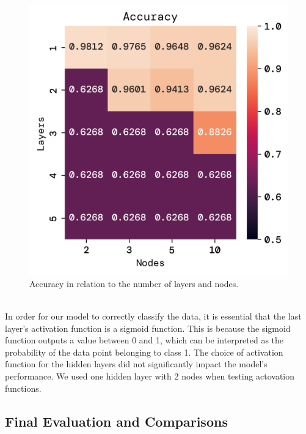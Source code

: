\documentclass[twoside,11pt]{report}
\begin{document}
\begin{figure}[!ht]
\begin{minipage}[t]{0.5\textwidth - 1mm}
\begin{center}
                \includegraphics[width=\textwidth]{../runsAndFigures/accuracy_layers_nodes.png}
            \end{center}
            \caption
            {
                Accuracy in relation to the number of layers and nodes.
            }\label{fig:accuracy_layers_nodes}
        \end{minipage}
    \end{figure}


    \noindent
    \\
    In order for our model to correctly classify the data, it is essential that the last layer's activation function
    is a sigmoid function. This is because the sigmoid function outputs a value between 0 and 1, which can be
    interpreted as the probability of the data point belonging to class 1. The choice of activation function for the
    hidden layers did not significantly impact the model's performance.
    We used one hidden layer with 2 nodes when testing actovation functions.

\newpage
\subsection{Final Evaluation and Comparisons}
\label{sec:comparisons}
\end{document}
